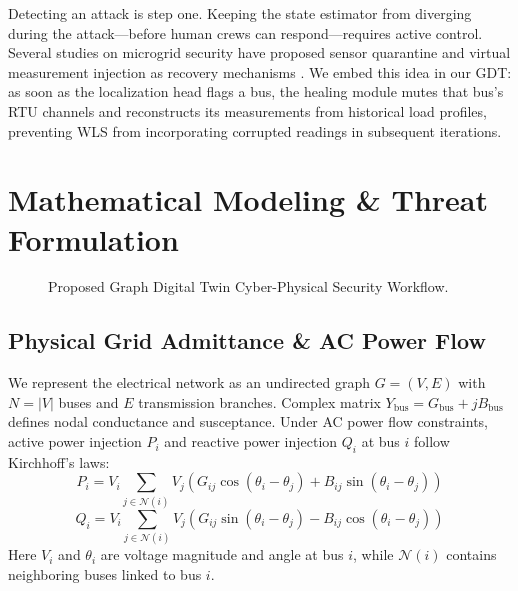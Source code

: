 \documentclass[conference]{IEEEtran}
\begin{document}
Detecting an attack is step one. Keeping the state estimator from diverging during the attack---before human crews can respond---requires active control. Several studies on microgrid security have proposed sensor quarantine and virtual measurement injection as recovery mechanisms \cite{b9}. We embed this idea in our GDT: as soon as the localization head flags a bus, the healing module mutes that bus's RTU channels and reconstructs its measurements from historical load profiles, preventing WLS from incorporating corrupted readings in subsequent iterations.

\section{Mathematical Modeling \& Threat Formulation}

\begin{figure}[htbp]
\centering
{}
\caption{Proposed Graph Digital Twin Cyber-Physical Security Workflow.}
\label{fig:flowchart}
\end{figure}

\subsection{Physical Grid Admittance \& AC Power Flow}
We represent the electrical network as an undirected graph $G = (V, E)$ with $N = |V|$ buses and $E$ transmission branches. Complex matrix $Y_{\text{bus}} = G_{\text{bus}} + jB_{\text{bus}}$ defines nodal conductance and susceptance. Under AC power flow constraints, active power injection $P_i$ and reactive power injection $Q_i$ at bus $i$ follow Kirchhoff's laws:
\begin{equation}
P_i = V_i \sum_{j \in \mathcal{N}(i)} V_j \left( G_{ij} \cos(\theta_i - \theta_j) + B_{ij} \sin(\theta_i - \theta_j) \right)
\end{equation}
\begin{equation}
Q_i = V_i \sum_{j \in \mathcal{N}(i)} V_j \left( G_{ij} \sin(\theta_i - \theta_j) - B_{ij} \cos(\theta_i - \theta_j) \right)
\end{equation}
Here $V_i$ and $\theta_i$ are voltage magnitude and angle at bus $i$, while $\mathcal{N}(i)$ contains neighboring buses linked to bus $i$.
\end{document}
